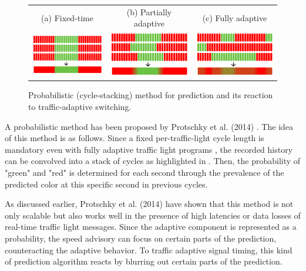 \begin{figure}[t]
\centering 
\begin{tabular}{ccc}
\footnotesize{(a) Fixed-time} & \footnotesize{(b) Partially adaptive} & \footnotesize{(c) Fully adaptive} \\
\includegraphics[width=0.3\linewidth]{images/explanation-fixed-time.png} & \includegraphics[width=0.3\linewidth]{images/explanation-partially-adaptive.png} & \includegraphics[width=0.3\linewidth]{images/explanation-fully-adaptive.png}
\end{tabular}
\caption{Probabilistic (cycle-stacking) method for prediction and its reaction to traffic-adaptive switching.}
\label{fig:prediction}
\end{figure}

A probabilistic method has been proposed by Protschky et al. (2014) \cite{protschky_extensive_2014, protschky_adaptive_2014}. The idea of this method is as follows. Since a fixed per-traffic-light cycle length is mandatory even with fully adaptive traffic light programs \cite{protschky_extensive_2014}, the recorded history can be convolved into a stack of cycles as highlighted in . Then, the probability of "green" and "red" is determined for each second through the prevalence of the predicted color at this specific second in previous cycles.

As discussed earlier, Protschky et al. (2014) \cite{protschky_extensive_2014, protschky_adaptive_2014} have shown that this method is not only scalable but also works well in the presence of high latencies or data losses of real-time traffic light messages. Since the adaptive component is represented as a probability, the speed advisory can focus on certain parts of the prediction, counteracting the adaptive behavior. To traffic adaptive signal timing, this kind of prediction algorithm reacts by blurring out certain parts of the prediction. 

